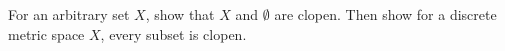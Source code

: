 For an arbitrary set $X$, show that $X$ and $\emptyset$ are clopen. Then show for a discrete metric
space $X$, every subset is clopen.\\